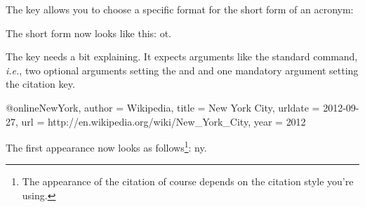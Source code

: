 \documentclass[load-preamble+]{cnltx-doc}
\newcommand*\latin{\textit}
\begin{document}
The  key allows you to choose a specific format for the short
form of an acronym:
\begin{sourcecode}
\end{sourcecode}
The short form now looks like this: \acs{ot}.

The  key needs a bit explaining.  It expects arguments like the
standard  command, \latin{i.e.}, two optional arguments setting the
 and  and one mandatory argument setting the
citation key.
\begin{sourcecode}
\end{sourcecode}

\begin{sourcecode}[sourcecode-options={style=cnltx-bibtex}]
  @online{NewYork,
    author  = {Wikipedia},
    title   = {New York City},
    urldate = {2012-09-27},
    url     = {http://en.wikipedia.org/wiki/New_York_City},
    year    = {2012}
  }
\end{sourcecode}
The first appearance now looks as follows\footnote{The appearance of the
  citation of course depends on the citation style you're using.}: \acf{ny}.
\end{document}
